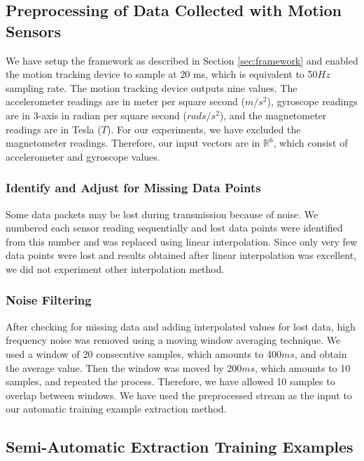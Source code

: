 \documentclass{IEEEtran}
\begin{document}
\subsection{Preprocessing of Data Collected with Motion Sensors }

We have setup the framework as described in Section \ref{sec:framework} and enabled the 
motion tracking device to sample at $20$ ms, which is equivalent to 50$Hz$ 
sampling rate. The motion tracking device outputs nine values. The  
accelerometer readings are in  meter per square second ($m/s^2$), gyroscope readings are 
in 3-axis in radian per square second ($rads/s^2$), and the magnetometer readings are  in 
Tesla ($T$). For our experiments, we have excluded the magnetometer readings. Therefore, 
our input vectors are in $\mathbb{R}^6$, which consist of accelerometer and gyroscope 
values.

\subsubsection{Identify and Adjust for Missing Data Points}
\label{sec:IdentifyAndAdjustForMissingDataPoints}
Some data packets may be lost during transmission because of noise. We numbered each sensor reading sequentially and lost data points were identified from this number and was replaced using linear interpolation. Since only very few data points were lost and results obtained after linear interpolation was excellent, we did not experiment other interpolation method.

\subsubsection{Noise Filtering}
\label{sec:NoiseFiltering}

After checking for missing data and adding interpolated values for lost data,  high frequency noise was removed using a moving window averaging technique. We used a window  of 20 consecutive samples, which amounts to 400$ms$, 
and obtain the average value. Then the  window was moved by 200$ms$, which amounts to 10 samples, and 
repeated the process. Therefore, we have allowed 10 samples to overlap between windows. 
We have used the preprocessed stream as the input to our automatic training example 
extraction method.


\subsection{Semi-Automatic  Extraction Training Examples}
\end{document}
